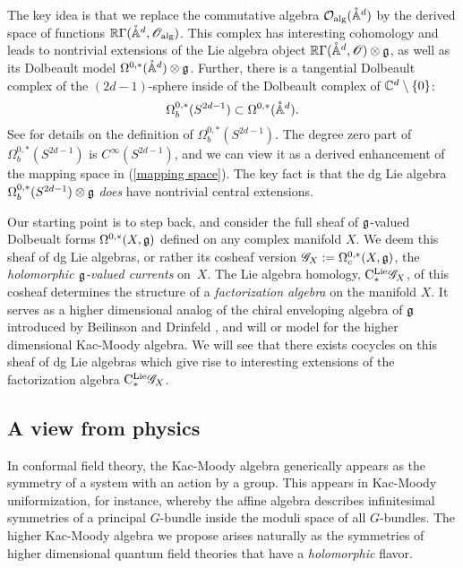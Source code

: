The key idea is that we replace the commutative algebra $\mathcal O_{\rm alg}(\mathring{\mathbb A}^{d})$ by the derived space of functions $\mathbb R \Gamma(\mathring{\mathbb A}^{d}, \mathscr O_{\rm alg})$. 
This complex has interesting cohomology and leads to nontrivial extensions of the Lie algebra object $\mathbb R \Gamma(\mathring{\mathbb A}^{d}, \mathscr O) \otimes \mathfrak g$, as well as its Dolbeault model $\Omega^{0,*}(\mathring{\mathbb A}^d) \otimes \mathfrak g$.
Further, there is a tangential Dolbeault complex of the $(2d-1)$-sphere inside of the Dolbeault complex of $\mathbb C^d \setminus \{0\}$:
\[
\Omega_b^{0,*}(S^{2d-1}) \subset \Omega^{0,*}(\mathring{\mathbb A}^d) .
\]
See \cite{DragomirTomassini} for details on the definition of $\Omega_b^{0,*}(S^{2d-1})$. 
The degree zero part of $\Omega_b^{0,*}(S^{2d-1})$ is $C^\infty(S^{2d-1})$, and we can view it as a derived enhancement of the mapping space in (\ref{mapping space}). 
The key fact is that the dg Lie algebra $\Omega^{0,*}_b(S^{2d-1}) \otimes \mathfrak g$ {\em does} have nontrivial central extensions. 

Our starting point is to step back, and consider the full sheaf of $\mathfrak g$-valued Dolbeualt forms $\Omega^{0,*}(X, \mathfrak g)$ defined on any complex manifold $X$. 
We deem this sheaf of dg Lie algebras, or rather its cosheaf version $\mathscr G_X := \Omega^{0,*}_c(X, \mathfrak g)$, the {\em holomorphic $\mathfrak g$-valued currents} on~$X$. 
The Lie algebra homology, ${\rm C}^{\rm Lie}_*\mathscr G_X$, of this cosheaf determines the structure of a {\em factorization algebra} on the manifold $X$.
It serves as a higher dimensional analog of the chiral enveloping algebra of $\mathfrak g$ introduced by Beilinson and Drinfeld \cite{BD}, and will or model for the higher dimensional Kac-Moody algebra. 
We will see that there exists cocycles on this sheaf of dg Lie algebras which give rise to interesting extensions of the factorization algebra ${\rm C}^{\rm Lie}_*\mathscr G_X$.\\

\subsection*{A view from physics}

In conformal field theory, the Kac-Moody algebra generically appears as the symmetry of a system with an action by a group. 
This appears in Kac-Moody uniformization, for instance, whereby the affine algebra describes infinitesimal symmetries of a principal $G$-bundle inside the moduli space of all $G$-bundles. 
The higher Kac-Moody algebra we propose arises naturally as the symmetries of higher dimensional quantum field theories that have a {\em holomorphic} flavor. 

